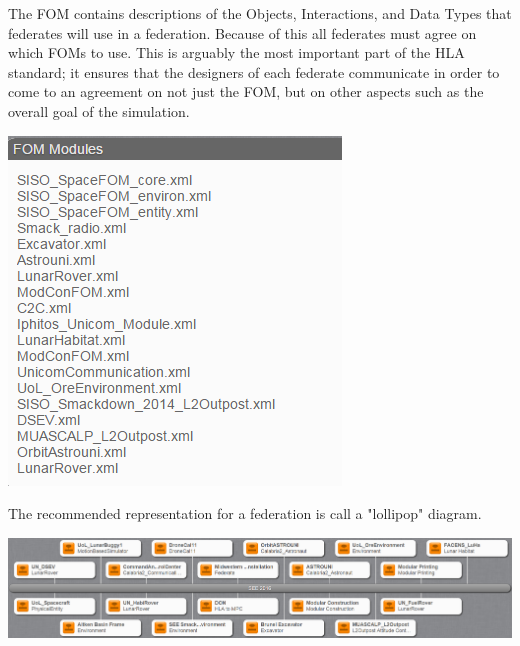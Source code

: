 \documentclass{article}
\begin{document}
\begin{multicols}{2}
		The FOM contains descriptions of the Objects, Interactions, and Data Types that federates will use in a federation. Because of this all federates must agree on which FOMs to use. This is arguably the most important part of the HLA standard; it ensures that the designers of each federate communicate in order to come to an agreement on not just the FOM, but on other aspects such as the overall goal of the simulation.
		
		\label{fom}
		\includegraphics[width=\columnwidth]{fom.png}
		
		The recommended representation for a federation is call a "lollipop" diagram. 
		
		\label{lollipop}
		\includegraphics[width=\columnwidth]{lollipop.png}
		
		
		
	\end{multicols}
\end{document}
